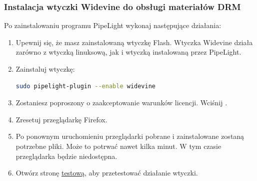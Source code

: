 \subsubsection{Instalacja wtyczki Widevine do obsługi materiałów DRM}
\noindent Po zainstalowaniu programu PipeLight wykonaj następujące działania:
\begin{enumerate}
\item Upewnij się, że masz zainstalowaną wtyczkę Flash. Wtyczka Widevine działa zarówno z wtyczką linuksową, jak i wtyczką instalowaną przez PipeLight.
\item Zainstaluj wtyczkę:
\begin{lstlisting}[language=bash]
sudo pipelight-plugin --enable widevine
\end{lstlisting}
\item Zostaniesz poproszony o zaakceptowanie warunków licencji. Wciśnij .
\item Zresetuj przeglądarkę Firefox.
\item Po ponownym uruchomieniu przeglądarki pobrane i zainstalowane zostaną potrzebne pliki. Może to potrwać nawet kilka minut. W tym czasie przeglądarka będzie niedostępna.
\item Otwórz stronę \href{http://www.widevine.com/demo/index.html}{testową}, aby przetestować działanie wtyczki.
\end{enumerate}


